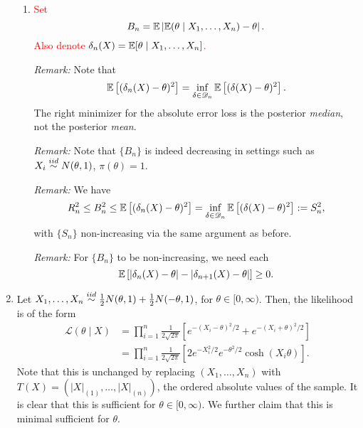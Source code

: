 \documentclass[11pt]{article}
\begin{document}
\begin{enumerate}
\begin{enumerate}
            \item \textcolor{red}{Set \[
                B_n
                    = \mathbb{E} \left|\mathbb{E}(\theta \mid X_1, \dots, X_n) - \theta\right|.
            \]
            Also denote $\delta_n(X) = \mathbb{E}[\theta\mid X_1, \dots, X_n]$.
            }

            \emph{Remark:} Note that \[
                \mathbb{E}\left[(\delta_n(X) - \theta)^2\right]
                    = \inf_{\delta \in \mathscr{D}_n} \mathbb{E}\left[(\delta(X) - \theta)^2\right].
            \] The right minimizer for the absolute error loss is the posterior
            \emph{median}, not the posterior \emph{mean}.

            \emph{Remark:} Note that $\{B_n\}$ is indeed decreasing in settings
            such as $X_i \overset{iid}{\sim} N(\theta, 1)$, $\pi(\theta) = 1$.

            \emph{Remark:} We have \[
                R_n^2
                    \leq B_n^2
                    \leq \mathbb{E}\left[(\delta_n(X) - \theta)^2\right]
                    = \inf_{\delta \in \mathscr{D}_n} \mathbb{E}\left[(\delta(X) - \theta)^2\right]
                    := S_n^2,
            \] with $\{S_n\}$ non-increasing via the same argument as before.

            \emph{Remark:} For $\{B_n\}$ to be non-increasing, we need each \[
                \mathbb{E}\left[|\delta_n(X) - \theta| - |\delta_{n + 1}(X) - \theta|\right] \geq 0.
            \] 


        \end{enumerate}


        \item Let $X_1, \dots, X_n \overset{iid}{\sim} \frac{1}{2}N(\theta, 1) +
        \frac{1}{2}N(-\theta, 1)$, for $\theta \in [0, \infty)$.
        Then, the likelihood is of the form \begin{align*}
            \mathcal{L}(\theta\mid X)
                &= \prod_{i = 1}^n \frac{1}{2\sqrt{2\pi}}\left[e^{-(X_i - \theta)^2 / 2} + e^{-(X_i + \theta)^2 / 2}\right] \\
                &= \prod_{i = 1}^n \frac{1}{2\sqrt{2\pi}}\left[2e^{-X_i^2 / 2} e^{-\theta^2 / 2} \cosh(X_i\theta)\right].
        \end{align*}
        Note that this is unchanged by replacing $(X_1, \dots, X_n)$ with $T(X)
        = (|X|_{(1)}, \dots, |X|_{(n)})$, the ordered absolute values of the
        sample.
        It is clear that this is sufficient for $\theta \in [0, \infty)$.
        We further claim that this is minimal sufficient for $\theta$.


\end{enumerate}
\end{document}
